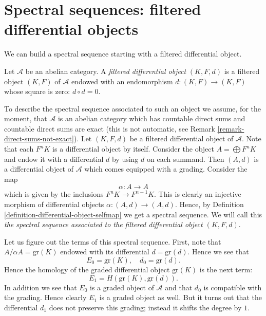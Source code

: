 \section{Spectral sequences: filtered differential objects}
\label{section-filtered-differential}

\noindent
We can build a spectral sequence starting with a filtered
differential object.

\begin{definition}
\label{definition-filtered-differential}
Let $\mathcal{A}$ be an abelian category.
A {\it filtered differential object} $(K, F, d)$ is a filtered object
$(K, F)$ of $\mathcal{A}$ endowed with an endomorphism
$d : (K, F) \to (K, F)$ whose square is zero: $d \circ d = 0$.
\end{definition}

\noindent
To describe the spectral sequence associated to such an object
we assume, for the moment, that $\mathcal{A}$ is an abelian category
which has countable direct sums and countable direct sums are exact
(this is not automatic, see Remark \ref{remark-direct-sums-not-exact}).
Let $(K, F, d)$ be a filtered differential object of $\mathcal{A}$.
Note that each $F^nK$ is a differential object by itself.
Consider the object $A = \bigoplus F^nK$ and endow it with a
differential $d$ by using $d$ on each summand.
Then $(A, d)$ is a differential object of $\mathcal{A}$
which comes equipped with a grading. Consider the map
$$
\alpha : A \to A
$$
which is given by the inclusions $F^nK \to F^{n - 1}K$.
This is clearly an injective morphism of differential objects
$\alpha : (A, d) \to (A, d)$. Hence, by
Definition \ref{definition-differential-object-selfmap}
we get a spectral sequence.
We will call this {\it the spectral sequence associated to
the filtered differential object $(K, F, d)$}.

\medskip\noindent
Let us figure out the terms of this spectral sequence.
First, note that $A/\alpha A = \text{gr}(K)$
endowed with its differential $d = \text{gr}(d)$. Hence we see that
$$
E_0 = \text{gr}(K), \quad d_0 = \text{gr}(d).
$$
Hence the homology of the graded differential object $\text{gr}(K)$
is the next term:
$$
E_1 = H(\text{gr}(K), \text{gr}(d)).
$$
In addition we see that $E_0$ is a graded object of $\mathcal{A}$
and that $d_0$ is compatible with the grading. Hence clearly $E_1$
is a graded object as well. But it turns out that the differential
$d_1$ does not preserve this grading; instead it shifts the degree by $1$.

